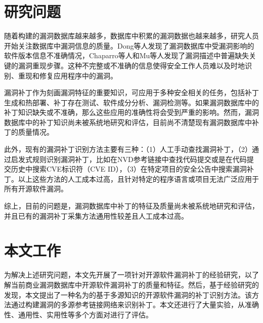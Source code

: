 \section{研究问题}
随着构建的漏洞数据库越来越多，数据库中积累的漏洞数据也越来越多，研究人员开始关注数据库中漏洞信息的质量。Dong等人\cite{dong2019towards}发现了漏洞数据库中受漏洞影响的软件版本信息不准确情况，Chaparro等人\cite{chaparro2017detecting}和Mu等人\cite{mu2018understanding}发现了漏洞描述中普遍缺失关键的漏洞重现步骤。这种不完整或不准确的信息使得安全工作人员难以及时地识别、重现和修复应用程序中的漏洞。

漏洞补丁作为刻画漏洞特征的重要知识，可应用于多种安全相关的任务，包括补丁生成和热部署\cite{mulliner2013patchdroid,duan2019automating,xu2020automatic}、补丁存在测试\cite{zhang2018precise,jiang2020pdiff,dai2020bscout}、软件成分分析\cite{ponta2020detection,pashchenko2020vuln4real,Wang2020empirical}、漏洞检测\cite{li2016vulpecker,li2018vuldeepecker,jang2012redebug,kim2017vuddy, xiao2020mvp, cui2020vuldetector}等。如果漏洞数据库中的补丁知识缺失或不准确，那么这些应用的准确性将会受到严重的影响。然而，漏洞数据库中的补丁知识尚未被系统地研究和评估，目前尚不清楚现有漏洞数据库中补丁的质量情况。

此外，现有的漏洞补丁识别方法主要有三种：（1）人工手动查找漏洞补丁\cite{xu2020automatic,jiang2020pdiff,dai2020bscout,zhou2017automated,sabetta2018practical,chen2020machine,xiao2020mvp,ponta2020detection,pashchenko2020vuln4real}，（2）通过启发式规则识别漏洞补丁，比如在NVD参考链接中查找代码提交\cite{duan2019automating,li2016vulpecker}或是在代码提交历史中搜索CVE标识符（CVE ID）\cite{you2017semfuzz,Wang2020empirical}，（3）在特定项目的安全公告中搜索漏洞补丁\cite{mulliner2013patchdroid,jang2012redebug,kim2017vuddy}。以上这些方法的人工成本过高，且针对特定的程序语言或项目无法广泛应用于所有开源软件漏洞。

综上，目前的问题是，漏洞数据库中补丁的特征及质量尚未被系统地研究和评估，并且已有的漏洞补丁采集方法通用性较差且人工成本过高。

\section{本文工作}
为解决上述研究问题，本文先开展了一项针对开源软件漏洞补丁的经验研究，以了解当前商业漏洞数据库中开源软件漏洞补丁的质量和特征。然后，基于经验研究的发现，本文提出了一种名为\tool 的基于多源知识的开源软件漏洞的补丁识别方法。该方法通过构建漏洞的多源参考链接网络来识别补丁。本文还进行了大量实验，从准确性、通用性、实用性等多个方面对\tool 进行了评估。

